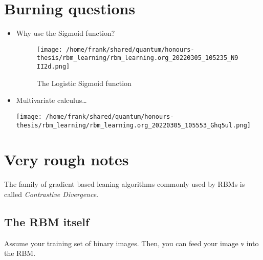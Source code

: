 \documentclass[11pt]{article}
\author{Frank Lu}
\date{\today}
\title{}
\begin{document}
\tableofcontents


\newsavebox{\mybox}
\newenvironment{Notes}
{\begin{lrbox}{\mybox}\begin{minipage}{\textwidth}}
{\end{minipage}\end{lrbox}\fbox{\usebox{\mybox}}\\}


\newcommand{\nH}{n_H}
\newcommand{\nV}{n_V}
\newcommand{\NH}{N_H}
\newcommand{\NV}{N_V}

\newcommand{\ls}{l_1l_2 \dots l_{\nH}}
\newcommand{\ones}{1, 1, \dots, 1}
\newcommand{\ks}{k_1k_2 \dots k_{\nH}}

\newcommand{\R}{\mathbb{R}}

\section{Burning questions}
\label{sec:org10ace28}
\begin{itemize}
\item Why use the Sigmoid function?
\begin{figure}[htbp]
\centering
\texttt{[image: /home/frank/shared/quantum/honours-thesis/rbm\_learning/rbm\_learning.org\_20220305\_105235\_N9II2d.png]}
\caption{The Logistic Sigmoid function}
\end{figure}

\item Multivariate calculus\ldots{}
\begin{center}
\texttt{[image: /home/frank/shared/quantum/honours-thesis/rbm\_learning/rbm\_learning.org\_20220305\_105553\_Ghq5ul.png]}
\end{center}
\end{itemize}

\section{Very rough notes}
\label{sec:org9ef9dd7}
The family of gradient based leaning algorithms commonly used by RBMs is called \emph{Contrastive Divergence}.

\subsection{The RBM itself}
\label{sec:orgdc1bf97}
Assume your training set of binary images. Then, you can feed your image \(\mathbb{v}\) into the RBM.
\end{document}
